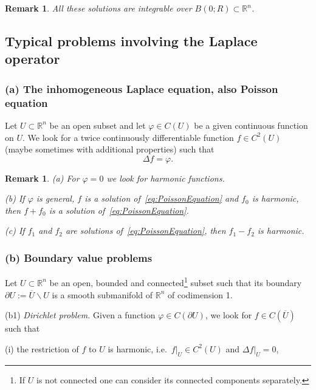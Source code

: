 \documentclass[12pt, oneside, a4paper]{article}
\theoremstyle{dfn}
\newtheorem{rem}[thm]{Remark}
\def\Rbb{\ensuremath{\mathbb{R}}}
\begin{document}
\begin{rem}
All these solutions are integrable over $B(0;R) \subset \Rbb^n$.
\end{rem}

\subsection{Typical problems involving the Laplace operator}

\subsubsection{(a) The inhomogeneous Laplace equation, also Poisson equation}

Let $U \subset \Rbb^n$ be an open subset and let $\varphi \in C(U)$ be a given continuous function on $U$. We look for a twice continuously differentiable function $f \in C^2(U)$ (maybe sometimes with additional properties) such that
\begin{equation}\label{eq:PoissonEquation}
\Delta f = \varphi.
\end{equation}

\begin{rem}
(a) For $\varphi = 0$ we look for harmonic functions.

(b) If $\varphi$ is general, $f$ is a solution of~\eqref{eq:PoissonEquation} and $f_0$ is harmonic, then $f + f_0$ is a solution of~\eqref{eq:PoissonEquation}.

(c) If $f_1$ and $f_2$ are solutions of~\eqref{eq:PoissonEquation}, then $f_1 - f_2$ is harmonic.
\end{rem}

\subsubsection{(b) Boundary value problems}

Let $U \subset \Rbb^n$ be an open, bounded and connected\footnote{If $U$ is not connected one can consider its connected components separately.} subset such that its boundary $\partial U := \overline{U} \smallsetminus U$ is a smooth submanifold of $\Rbb^n$ of codimension 1.

\vspace{6pt}
\noindent (b1) \emph{Dirichlet problem.} Given a function $\varphi \in C(\partial U)$, we look for $f \in C(\overline{U})$ such that

(i) the restriction of $f$ to $U$ is harmonic, i.e.\ $f|_U \in C^2(U)$ and $\Delta f|_U = 0$,
\end{document}
